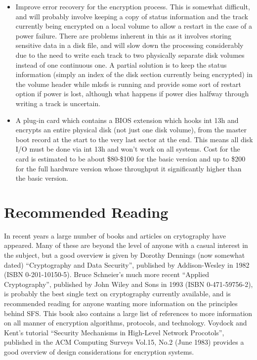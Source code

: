 \begin{itemize}

\item Improve error recovery for the encryption process.  This is somewhat
   difficult, and will probably involve keeping a copy of status information
   and the track currently being encrypted on a local volume to allow a restart
   in the case of a power failure.  There are problems inherent in this as it
   involves storing sensitive data in a disk file, and will slow down the
   processing considerably due to the need to write each track to two
   physically separate disk volumes instead of one continuous one.  A partial
   solution is to keep the status information (simply an index of the disk
   section currently being encrypted) in the volume header while mksfs is
   running and provide some sort of restart option if power is lost, although
   what happens if power dies halfway through writing a track is uncertain.

\item A plug-in card which contains a BIOS extension which hooks int 13h and
   encrypts an entire physical disk (not just one disk volume), from the
   master boot record at the start to the very last sector at the end.  This
   means all disk I/O must be done via int 13h and won't work on all systems.
   Cost for the card is estimated to be about \$80-\$100 for the basic version and
   up to \$200 for the full hardware version whose throughput it significantly
   higher than the basic version.

\end{itemize}

\section{Recommended Reading}

In recent years a large number of books and articles on crytography have
appeared.  Many of these are beyond the level of anyone with a casual interest
in the subject, but a good overview is given by Dorothy Dennings (now somewhat
dated) ``Cryptography and Data Security'', published by Addison-Wesley in 1982
(ISBN 0-201-10150-5).  Bruce Schneier's much more recent ``Applied
Cryptography'', published by John Wiley and Sons in 1993 (ISBN 0-471-59756-2),
is probably the best single text on cryptography currently available, and is
recommended reading for anyone wanting more information on the principles
behind SFS.  This book also contains a large list of references to more
information on all manner of encryption algorithms, protocols, and technology.
Voydock and Kent's tutorial ``Security Mechanisms in High-Level Network
Procotols'', published in the ACM Computing Surveys Vol.15, No.2 (June 1983)
provides a good overview of design considerations for encryption systems.

